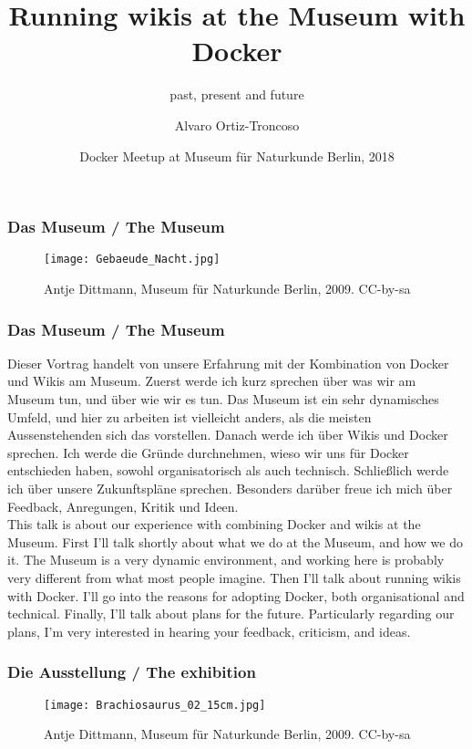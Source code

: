 \documentclass[12pt]{beamer}
\title
{Running wikis at the Museum with Docker}
\subtitle{past, present and future}
\author
{Alvaro Ortiz-Troncoso}
\date
{Docker Meetup at Museum für Naturkunde Berlin, 2018}
\begin{document}
{
  \frame{\titlepage}
}

\begin{frame}
  \frametitle{Das Museum / \textcolor{mfn_green}{The Museum}}
  \begin{figure}
    \texttt{[image: Gebaeude\_Nacht.jpg]}
    \caption{\textcopyright Antje Dittmann, Museum für Naturkunde Berlin, 2009. CC-by-sa}
  \end{figure}
\end{frame}

{\scriptsize
\begin{frame}
  \frametitle{Das Museum / \textcolor{mfn_green}{The Museum}}
  Dieser Vortrag handelt von unsere Erfahrung mit der Kombination von Docker und Wikis am Museum. Zuerst werde ich kurz sprechen über was wir am Museum tun, und über wie wir es tun. Das Museum ist ein sehr dynamisches Umfeld, und hier zu arbeiten ist vielleicht anders, als die meisten Aussenstehenden sich das vorstellen. Danach werde ich über Wikis und Docker sprechen. Ich werde die Gründe durchnehmen, wieso wir uns für Docker entschieden haben, sowohl organisatorisch als auch technisch. Schließlich werde ich über unsere Zukunftspläne sprechen. Besonders darüber freue ich mich über Feedback, Anregungen, Kritik und Ideen.\\
  \bigskip
  \textcolor{mfn_green}{This talk is about our experience with combining Docker and wikis at the Museum. First I'll talk shortly about what we do at the Museum, and how we do it. The Museum is a very dynamic environment, and working here is probably very different from what most people imagine. Then I'll talk about running wikis with Docker. I'll go into the reasons for adopting Docker, both organisational and technical. Finally, I'll talk about plans for the future. Particularly regarding our plans, I'm very interested in hearing your feedback, criticism, and ideas.}
\end{frame}
}
\begin{frame}
  \frametitle{Die Ausstellung / \textcolor{mfn_green}{The exhibition}}
  \begin{figure}
  \texttt{[image: Brachiosaurus\_02\_15cm.jpg]}
  \caption{\textcopyright Antje Dittmann, Museum für Naturkunde Berlin, 2009. CC-by-sa}
  \end{figure}
\end{frame}
\end{document}
